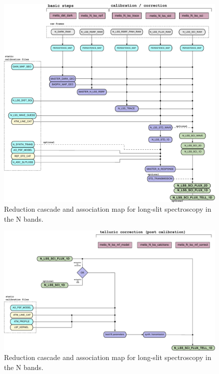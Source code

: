 \begin{landscape}
\begin{figure}[ht]
  \centering
  \includegraphics{figures/N_LSS_pipeline_wf_draft_latest_part_1_v0.82.pdf}
  \caption[Reduction cascade and association map for N long-slit
  spectroscopy]{Reduction cascade and association map for long-slit
    spectroscopy in the N bands. }
  \label{Fig:NLssAssomap1}
    \end{figure}
\end{landscape}

\begin{landscape}
\begin{figure}[ht]
  \centering
  \includegraphics{figures/N_LSS_pipeline_wf_draft_latest_part_2_v0.82.pdf}
  \caption[Reduction cascade and association map for N long-slit
  spectroscopy]{Reduction cascade and association map for long-slit
    spectroscopy in the N bands. }
  \label{Fig:NLssAssomap2}
\end{figure}
\end{landscape}


